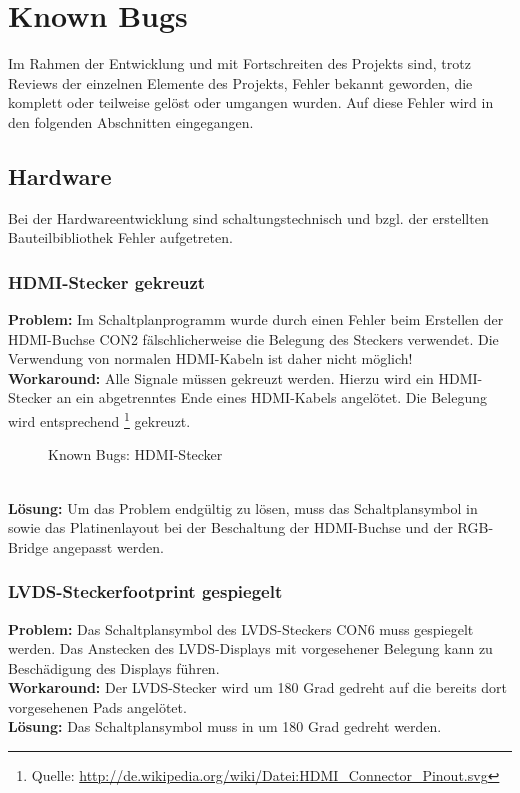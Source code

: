 \section{Known Bugs}
Im Rahmen der Entwicklung und mit Fortschreiten des Projekts sind, trotz Reviews der einzelnen Elemente des Projekts, Fehler bekannt geworden, die komplett oder teilweise gelöst oder umgangen wurden. Auf diese Fehler wird in den folgenden Abschnitten eingegangen.
\subsection{Hardware}
Bei der Hardwareentwicklung sind schaltungstechnisch und bzgl. der erstellten Bauteilbibliothek Fehler aufgetreten. 
\subsubsection{HDMI-Stecker gekreuzt}
\textbf{Problem:} Im Schaltplanprogramm  wurde durch einen Fehler beim Erstellen der HDMI-Buchse CON2 fälschlicherweise die Belegung des Steckers verwendet. Die Verwendung von normalen HDMI-Kabeln ist daher nicht möglich!\\
\textbf{Workaround:} Alle Signale müssen gekreuzt werden. Hierzu wird ein HDMI-Stecker an ein abgetrenntes Ende eines HDMI-Kabels angelötet. Die Belegung wird entsprechend \footnote{Quelle: \url{http://de.wikipedia.org/wiki/Datei:HDMI_Connector_Pinout.svg}} gekreuzt.
\begin{figure}[htp]
	\center
    \caption{Known Bugs: HDMI-Stecker}
    \label{fig:hdmi_stecker_problem}
\end{figure}\\
\textbf{Lösung:} Um das Problem endgültig zu lösen, muss das Schaltplansymbol in \\sowie das Platinenlayout bei der Beschaltung der HDMI-Buchse und der RGB-Bridge angepasst werden.
\subsubsection{LVDS-Steckerfootprint gespiegelt}
\textbf{Problem:} Das Schaltplansymbol des LVDS-Steckers CON6 muss gespiegelt werden. Das Anstecken des LVDS-Displays mit vorgesehener Belegung kann zu Beschädigung des Displays führen.\\
\textbf{Workaround:} Der LVDS-Stecker wird um 180 Grad gedreht auf die bereits dort vorgesehenen Pads angelötet.\\
\textbf{Lösung:} Das Schaltplansymbol muss in  um 180 Grad gedreht werden.
